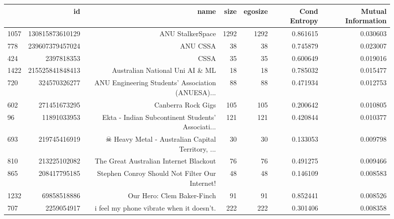 \documentclass[letterpaper]{article}
\begin{document}
\begin{figure}
\begin{table}
\begin{tabular}{| >{\small}l | >{\small}r | >{\small}r | >{\small}r | >{\small}r | >{\small}r |>{\small}r |}
\hline
{} &               id &                                               name &  size &  egosize &  Cond Entropy &  Mutual Information \\
\hline
1057 &  130815873610129 &                                   ANU StalkerSpace &  1292 &     1292 &             0.861615 &            0.030603 \\
778  &  239607379457024 &                                           ANU CSSA &    38 &       38 &             0.745879 &            0.023007 \\
424  &       2397818353 &                                               CSSA &    35 &       35 &             0.600649 &            0.019016 \\
1422 &  215525841848413 &                    Australian National Uni AI \& ML &    18 &       18 &             0.785032 &            0.015477 \\
720  &     324570326277 &  ANU Engineering Students' Association (ANUESA)... &    88 &       88 &             0.471934 &            0.012753 \\
602  &     271451673295 &                                 Canberra Rock Gigs &   105 &      105 &             0.200642 &            0.010805 \\
96   &      11891033953 &  Ekta - Indian Subcontinent Students' Associati... &   121 &      121 &             0.420844 &            0.010377 \\
693  &     219745416919 &  ☠ Heavy Metal - Australian Capital Territory, ... &    30 &       30 &             0.133053 &            0.009798 \\
810  &     213225102082 &             The Great Australian Internet Blackout &    76 &       76 &             0.491275 &            0.009466 \\
865  &     208417795185 &     Stephen Conroy Should Not Filter Our Internet! &    48 &       48 &             0.146109 &            0.008583 \\
1232 &      69858518886 &                         Our Hero: Clem Baker-Finch &    91 &       91 &             0.852441 &            0.008526 \\
707  &       2259054917 &           i feel my phone vibrate when it doesn't. &   222 &      222 &             0.301406 &            0.008358 \\

\end{tabular}
\end{table}
\end{figure}
\end{document}
